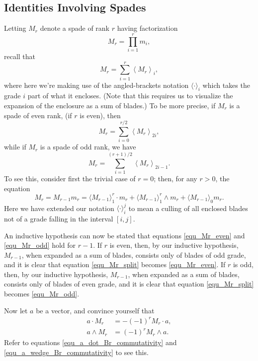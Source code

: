 \documentclass{birkjour}
\theoremstyle{definition}
\theoremstyle{remark}
\numberwithin{equation}{section}
\begin{document}
\subsection{Identities Involving Spades}

Letting $M_r$ denote a spade of rank $r$ having factorization
\begin{equation}\label{equ_M_r}
M_r = \prod_{i=1}^r m_i,
\end{equation}
recall that
\begin{equation*}
M_r = \sum_{i=1}^r\left\langle M_r\right\rangle_i,
\end{equation*}
where here we're making use of the angled-brackets notation $\langle\cdot\rangle_i$ which takes the grade $i$ part of
what it encloses.  (Note that this requires us to visualize the expansion of the enclosure as a sum of blades.)  To be more precise,
if $M_r$ is a spade of even rank, (if $r$ is even), then
\begin{equation}\label{equ_Mr_even}
M_r = \sum_{i=0}^{r/2}\left\langle M_r\right\rangle_{2i},
\end{equation}
while if $M_r$ is a spade of odd rank, we have
\begin{equation}\label{equ_Mr_odd}
M_r = \sum_{i=1}^{(r+1)/2}\left\langle M_r\right\rangle_{2i-1}.
\end{equation}
To see this, consider first the trivial case of $r=0$; then, for any $r>0$, the equation
\begin{equation}\label{equ_Mr_split}
M_r = M_{r-1}m_r = \langle M_{r-1}\rangle_1^r\cdot m_r + \langle M_{r-1}\rangle_1^r\wedge m_r + \langle M_{r-1}\rangle_0 m_r.
\end{equation}
Here we have extended our notation $\langle\cdot\rangle_i^j$ to mean a culling of all enclosed blades not of a grade falling
in the interval $[i,j]$.

An inductive hypothesis can now be stated that equations \eqref{equ_Mr_even} and \eqref{equ_Mr_odd} hold for $r-1$.
If $r$ is even, then, by our inductive hypothesis, $M_{r-1}$, when expanded as a sum of blades, consists only of blades of odd grade,
and it is clear that equation \eqref{equ_Mr_split} becomes \eqref{equ_Mr_even}.  If $r$ is odd, then, by our inductive hypothesis, $M_{r-1}$, when expanded as
a sum of blades, consists only of blades of even grade, and it is clear that equation \eqref{equ_Mr_split} becomes \eqref{equ_Mr_odd}.

Now let $a$ be a vector, and convince yourself that
\begin{align}
a\cdot M_r &= -(-1)^r M_r\cdot a,\label{equ_a_dot_Mr_commutativity} \\
a\wedge M_r &= (-1)^r M_r\wedge a.\label{equ_a_wedge_Mr_commutativity}
\end{align}
Refer to equations \eqref{equ_a_dot_Br_commutativity} and \eqref{equ_a_wedge_Br_commutativity} to see this.
\end{document}

